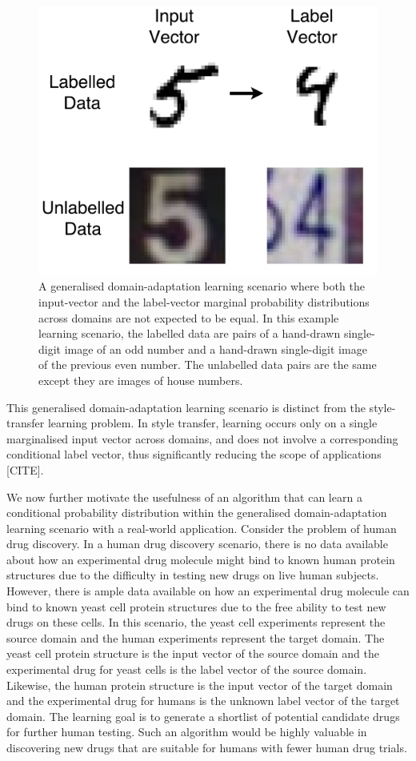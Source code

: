 \documentclass{article}
\begin{document}
\begin{figure}[ht]
\vskip 0.2in
\begin{center}
\centerline{\includegraphics[width=0.6\columnwidth]{example2}}
\caption{A generalised domain-adaptation learning scenario where both the input-vector and the label-vector marginal probability distributions across domains are not expected to be equal. In this example learning scenario, the labelled data are pairs of a hand-drawn single-digit image of an odd number and a hand-drawn single-digit image of the previous even number. The unlabelled data pairs are the same except they are images of house numbers.}
\label{icml-historical}
\end{center}
\vskip -0.2in
\end{figure}

This generalised domain-adaptation learning scenario is distinct from the style-transfer learning problem. In style transfer, learning occurs only on a single marginalised input vector across domains, and does not involve a corresponding conditional label vector, thus significantly reducing the scope of applications [CITE].

We now further motivate the usefulness of an algorithm that can learn a conditional probability distribution within the generalised domain-adaptation learning scenario with a real-world application. Consider the problem of human drug discovery. In a human drug discovery scenario, there is no data available about how an experimental drug molecule might bind to known human protein structures due to the difficulty in testing new drugs on live human subjects. However, there is ample data available on how an experimental drug molecule can bind to known yeast cell protein structures due to the free ability to test new drugs on these cells. In this scenario, the yeast cell experiments represent the source domain and the human experiments represent the target domain. The yeast cell protein structure is the input vector of the source domain and the experimental drug for yeast cells is the label vector of the source domain. Likewise, the human protein structure is the input vector of the target domain and the experimental drug for humans is the unknown label vector of the target domain. The learning goal is to generate a shortlist of potential candidate drugs for further human testing. Such an algorithm would be highly valuable in discovering new drugs that are suitable for humans with fewer human drug trials.
\end{document}
